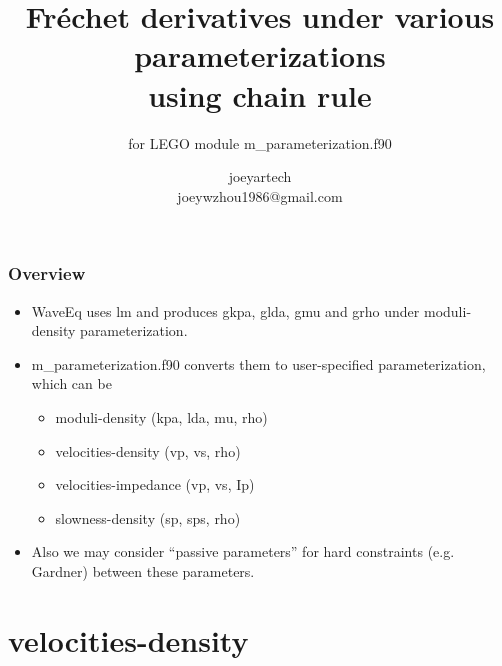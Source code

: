 \documentclass[9pt]{beamer}
\title[]{Fr\'echet derivatives under various parameterizations \\ using chain rule}
\subtitle{for LEGO module m\_parameterization.f90}
\author[joey]{joeyartech\\
\scriptsize{joeywzhou1986@gmail.com}}
\institute[]{Department of Geosciences, The University of Texas at Dallas}
\begin{document}

\maketitle \clearpage


\begin{frame}\frametitle{Overview}
  
  \begin{center}
  \end{center}

  \begin{itemize}
    \item WaveEq uses lm and produces gkpa, glda, gmu and grho under moduli-density parameterization.
    \item m\_parameterization.f90 converts them to user-specified parameterization, which can be
    \begin{itemize}
      \item moduli-density (kpa, lda, mu, rho)
      \item velocities-density (vp, vs, rho)
      \item velocities-impedance (vp, vs, Ip)
      \item slowness-density (sp, sps, rho)
    \end{itemize}
    \item Also we may consider ``passive parameters'' for hard constraints (e.g. Gardner) between these parameters.
  \end{itemize}

\end{frame}

\section{velocities-density}
\end{document}
